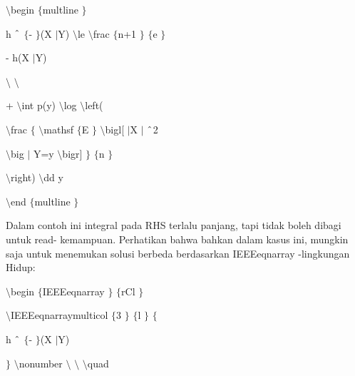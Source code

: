 \vspace{12pt}
\noindent 
 $  \setminus  $begin $  \{  $multline $  \}  $ \par
\vspace{12pt}
\noindent 
h $  \string^  $ $  \{  $- $  \}  $(X $  \vert  $Y)  $  \setminus  $le  $  \setminus  $frac $  \{  $n+1 $  \}  $ $  \{  $e $  \}  $ \par
\vspace{12pt}
\noindent 
- h(X $  \vert  $Y) \par
\vspace{12pt}
\noindent 
 $  \setminus  $ $  \setminus  $ \par
\noindent 
+  $  \setminus  $int p(y)  $  \setminus  $log  $  \setminus  $left( \par
\vspace{12pt}
\noindent 
 $  \setminus  $frac $  \{  $ $  \setminus  $mathsf $  \{  $E $  \}  $ $  \setminus  $bigl[ $  \vert  $X $  \vert  $ $  \string^  $2 \par
\vspace{12pt}
\noindent 
 $  \setminus  $big $  \vert  $ Y=y $  \setminus  $bigr] $  \}  $ $  \{  $n $  \}  $ \par
\vspace{12pt}
\noindent 
 $  \setminus  $right)  $  \setminus  $dd y \par
\noindent 
 $  \setminus  $end $  \{  $multline $  \}  $ \par
\noindent 
Dalam contoh ini integral pada RHS terlalu panjang, tapi tidak boleh dibagi untuk read- kemampuan. Perhatikan bahwa bahkan dalam kasus ini, mungkin saja untuk menemukan solusi berbeda berdasarkan IEEEeqnarray -lingkungan Hidup: \par
\vspace{12pt}
\vspace{12pt}
\noindent 
 $  \setminus  $begin $  \{  $IEEEeqnarray $  \}  $ $  \{  $rCl $  \}  $ \par
\vspace{12pt}
\noindent 
 $  \setminus  $IEEEeqnarraymulticol $  \{  $3 $  \}  $ $  \{  $l $  \}  $ $  \{  $ \par
\vspace{12pt}
\noindent 
h $  \string^  $ $  \{  $- $  \}  $(X $  \vert  $Y) \par
\vspace{12pt}
\noindent 
 $  \}  $ $  \setminus  $nonumber $  \setminus  $ $  \setminus  $ $  \setminus  $quad \par
\vspace{12pt}
